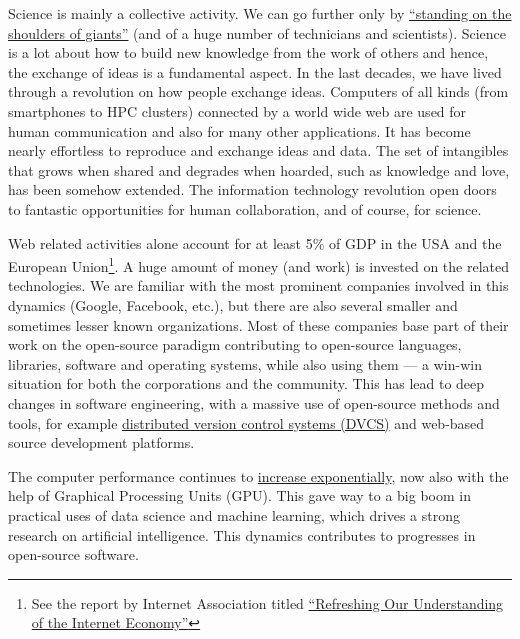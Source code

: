 Science is mainly a collective activity.  We can go further only by
\href{https://en.wikipedia.org/wiki/%
Standing_on_the_shoulders_of_giants}{``standing on the shoulders of giants''}
(and of a huge number of technicians and scientists).  Science is a lot about
how to build new knowledge from the work of others and hence, the exchange
of ideas is a fundamental aspect.
%
In the last decades, we have lived through a revolution on how people exchange
ideas.
%
Computers of all kinds (from smartphones to HPC clusters) connected by a world
wide web are used for human communication and also for many other applications.
%
It has become nearly effortless to reproduce and exchange ideas and data.
%
The set of intangibles that grows when shared and degrades when hoarded, such as
knowledge and love, has been somehow extended.
%
The information technology revolution open doors to fantastic opportunities for
human collaboration, and of course, for science.

Web related activities alone account for at least 5\% of GDP in the USA and the
European Union\footnote{See the report by Internet Association titled
\href{https://internetassociation.org/reports/refreshing-understanding-internet-economy-ia-report/}
{``Refreshing Our Understanding of the Internet Economy''}}.
A huge amount of money (and work) is invested on the related technologies. We
are familiar with the most prominent companies involved in this dynamics
(Google, Facebook, etc.), but there are also several smaller and sometimes
lesser known organizations.  Most of these companies base part of their work on
the open-source paradigm contributing to open-source languages, libraries,
software and operating systems, while also using them --- a win-win situation
for both the corporations and the community.
%
This has lead to deep changes in software engineering, with a massive use of
open-source methods and tools, for example
\href{https://en.wikipedia.org/wiki/Distributed_version_control}{distributed
version control systems (DVCS)} and web-based source development platforms.

The computer performance continues to
\href{https://en.wikipedia.org/wiki/Moore\%27s_law}{increase exponentially},
now also with the help of Graphical Processing Units (GPU). This gave way to a
big boom in practical uses of data science and machine learning, which drives a
strong research on artificial intelligence.  This dynamics contributes to
progresses in open-source software.

